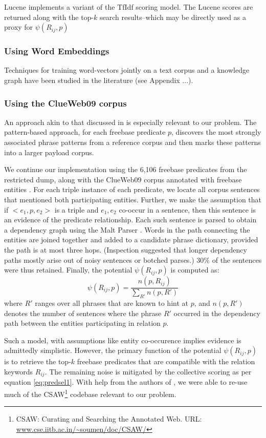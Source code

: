 \documentclass[a4paper, twoside, 12pt]{report}
\begin{document}
Lucene implements a variant of the TfIdf scoring model. The Lucene scores are returned along with the top-$k$ search results--which may be directly used as a proxy for $\psi(R_{ij}, p)$

\subsubsection{Using Word Embeddings}
Techniques for training word-vectors jointly on a text corpus and a knowledge graph have been studied in the literature (see Appendix ...).

\subsubsection{Using the ClueWeb09 corpus}
An approach akin to that discussed in \cite{joshiknowledge} is especially relevant to our problem. The pattern-based approach, for each freebase predicate $p$, discovers the most strongly associated phrase patterns from a reference corpus and then marks these patterns into a larger payload corpus.

We continue our implementation using the 6,106 freebase predicates from the restricted dump, along with the ClueWeb09 corpus annotated with freebase entities \cite{gabrilovich2013facc1}. For each triple instance of each predicate, we locate all corpus sentences that mentioned both participating entities. Further, we make the assumption that if $<e_1, p, e_2>$ is a triple and $e_1, e_2$ co-occur in a sentence, then this sentence is an evidence of the predicate relationship. Each such sentence is parsed to obtain a dependency graph using the Malt Parser \cite{nivre2007maltparser}. Words in the path connecting the entities are joined together and added to a candidate phrase dictionary, provided the path is at most three hops. (Inspection suggested that longer dependency paths mostly arise out of noisy sentences or botched parses.) 30\% of the sentences were
thus retained. Finally, the potential $\psi(R_{ij}, p)$ is computed as:
$$\psi(R_{ij},p) = \frac{n(p, R_{ij})}{\sum_{R'}{n(p, R')}}$$
where $R'$ ranges over all phrases that are known to
hint at $p$, and $n(p, R')$ denotes the number of sentences
where the phrase $R'$ occurred in the dependency
path between the entities participating in relation
$p$.

Such a model, with assumptions like entity co-occurence implies evidence is admittedly simplistic. However, the primary function of the potential $\psi(R_{ij}, p)$ is to retrieve the top-$k$ freebase predicates that are compatible with the relation keywords $R_{ij}$. The remaining noise is mitigated by the collective scoring as per equation \ref{eq:predsel1}. With help from the authors of \cite{joshiknowledge}, we were able to re-use much of the CSAW\footnote{CSAW: Curating and Searching the Annotated Web. URL: \url{www.cse.iitb.ac.in/~soumen/doc/CSAW/}} codebase relevant to our problem.
\end{document}
